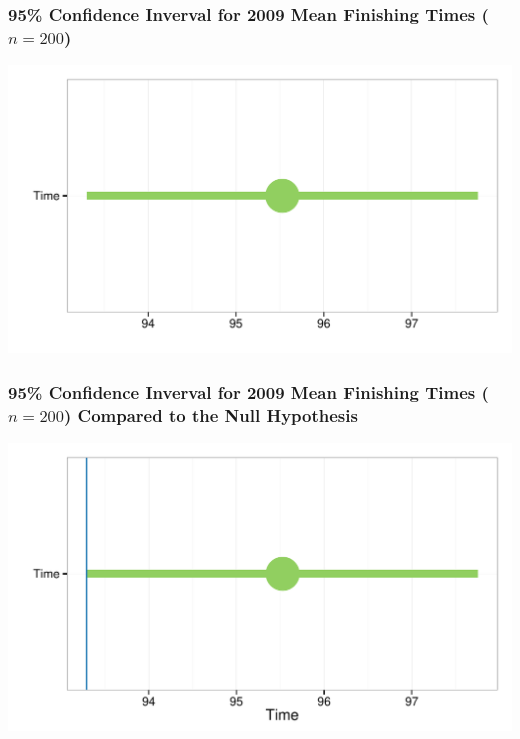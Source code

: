 \documentclass{beamer}\usepackage{graphicx, color}
\makeatletter
\def\maxwidth{ %
  \ifdim\Gin@nat@width>\linewidth
    \linewidth
  \else
    \Gin@nat@width
  \fi
}
\newenvironment{knitrout}{}{} %
\makeatother
\begin{document}


\begin{frame}[fragile]
  \frametitle{95\% Confidence Inverval for 2009 Mean Finishing Times ($n = 200$)}
\begin{knitrout}
\color{fgcolor}

{\centering \includegraphics[width=\maxwidth]{figure/TimeCI} 

}


\end{knitrout}

\end{frame}

\begin{frame}[fragile]
  \frametitle{95\% Confidence Inverval for 2009 Mean Finishing Times ($n = 200$) Compared to the Null Hypothesis}
\begin{knitrout}
\color{fgcolor}

{\centering \includegraphics[width=\maxwidth]{figure/TimeCINull} 

}


\end{knitrout}

\end{frame}
\end{document}
